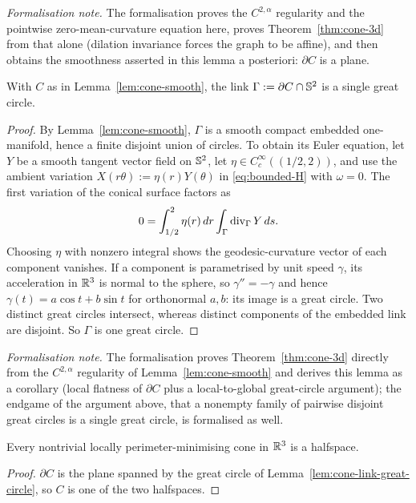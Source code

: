 \medskip\noindent\emph{Formalisation note.} The formalisation proves the $C^{2,\alpha}$ regularity and the pointwise zero-mean-curvature equation here, proves Theorem~\ref{thm:cone-3d} from that alone (dilation invariance forces the graph to be affine), and then obtains the smoothness asserted in this lemma a posteriori: $\partial C$ is a plane.

\begin{lemma}\label{lem:cone-link-great-circle}
With $C$ as in Lemma~\ref{lem:cone-smooth}, the link
$\Gamma:=\partial C\cap\mathbb S^2$ is a single great circle.
\end{lemma}

\begin{proof}
By Lemma~\ref{lem:cone-smooth}, $\Gamma$ is a smooth compact embedded
one-manifold, hence a finite disjoint union of circles.  To obtain its Euler
equation, let $Y$ be a smooth tangent vector field on $\mathbb S^2$, let
$\eta\in C^\infty_c((1/2,2))$, and use the ambient variation
$X(r\theta):=\eta(r)Y(\theta)$ in \eqref{eq:bounded-H} with $\omega=0$.  The
first variation of the conical surface factors as
\begin{equation}\label{eq:cone-link-variation}
  0=\int_{1/2}^2\eta(r)\,dr\int_\Gamma\operatorname{div}_\Gamma Y\,ds .
\end{equation}
Choosing $\eta$ with nonzero integral shows the geodesic-curvature vector of
each component vanishes.  If a component is parametrised by unit speed
$\gamma$, its acceleration in $\mathbb R^3$ is normal to the sphere, so
$\gamma''=-\gamma$ and hence $\gamma(t)=a\cos t+b\sin t$ for orthonormal
$a,b$: its image is a great circle.  Two distinct great circles intersect,
whereas distinct components of the embedded link are disjoint.  So $\Gamma$ is
one great circle.
\end{proof}

\medskip\noindent\emph{Formalisation note.} The formalisation proves Theorem~\ref{thm:cone-3d} directly from the $C^{2,\alpha}$ regularity of Lemma~\ref{lem:cone-smooth} and derives this lemma as a corollary (local flatness of $\partial C$ plus a local-to-global great-circle argument); the endgame of the argument above, that a nonempty family of pairwise disjoint great circles is a single great circle, is formalised as well.

\begin{theorem}
\label{thm:cone-3d}
Every nontrivial locally perimeter-minimising cone in $\mathbb R^3$ is a halfspace.
\end{theorem}

\begin{proof}
$\partial C$ is the plane spanned by the great circle of
Lemma~\ref{lem:cone-link-great-circle}, so $C$ is one of the two halfspaces.
\end{proof}

